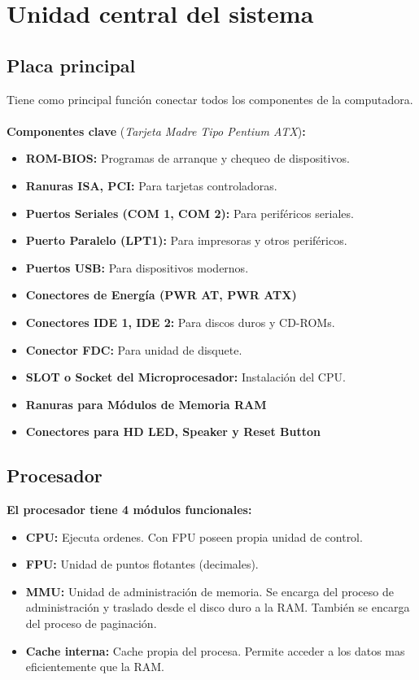 \documentclass{templateNote}
\begin{document}
\section{Unidad central del sistema}

\subsection{Placa principal}
\noindent Tiene como principal función conectar todos los componentes de la computadora.\\\\
\textbf{Componentes clave} (\textit{Tarjeta Madre Tipo Pentium ATX})\textbf{:}
\begin{itemize}
    \item \textbf{ROM-BIOS:} Programas de arranque y chequeo de dispositivos.
    \item \textbf{Ranuras ISA, PCI:} Para tarjetas controladoras.
    \item \textbf{Puertos Seriales (COM 1, COM 2):} Para periféricos seriales.
    \item \textbf{Puerto Paralelo (LPT1):} Para impresoras y otros periféricos.
    \item \textbf{Puertos USB:} Para dispositivos modernos.
    \item \textbf{Conectores de Energía (PWR AT, PWR ATX)}
    \item \textbf{Conectores IDE 1, IDE 2:} Para discos duros y CD-ROMs.
    \item \textbf{Conector FDC:} Para unidad de disquete.
    \item \textbf{SLOT o Socket del Microprocesador:} Instalación del CPU.
    \item \textbf{Ranuras para Módulos de Memoria RAM}
    \item \textbf{Conectores para HD LED, Speaker y Reset Button}
    
\end{itemize}

\subsection{Procesador}
\noindent \textbf{El procesador tiene 4 módulos funcionales:}
\begin{itemize}
    \item \textbf{CPU:} Ejecuta ordenes. Con FPU poseen propia unidad de control.
    \item \textbf{FPU:} Unidad de puntos flotantes (decimales).
    \item \textbf{MMU:} Unidad de administración de memoria. Se encarga del proceso de administración y traslado desde el disco duro a la RAM. 
                        También se encarga del proceso de paginación.
    \item \textbf{Cache interna:} Cache propia del procesa. Permite acceder a los datos mas eficientemente que la RAM.
\end{itemize}
\end{document}
